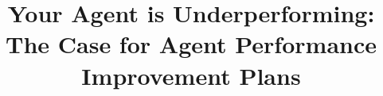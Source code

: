 \documentclass[conference]{IEEEtran}
\begin{document}
\title{Your Agent is Underperforming:\\
The Case for Agent Performance Improvement Plans}

\author{
}

\maketitle














\end{document}
